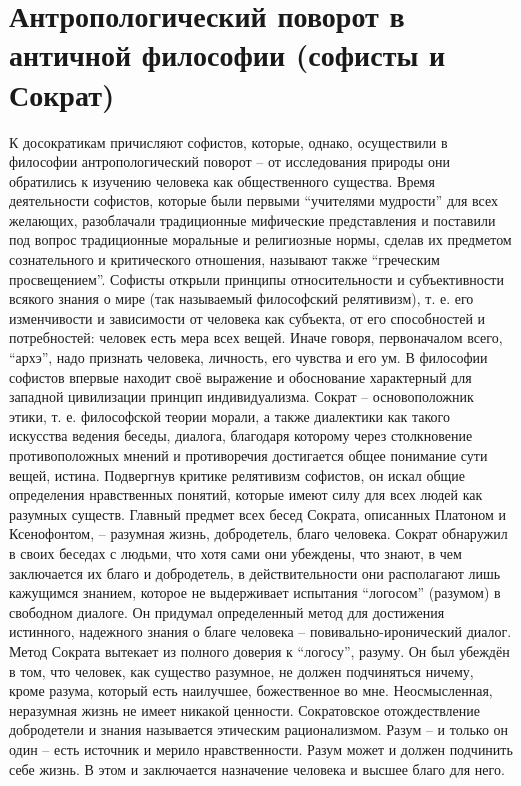 \documentclass[12pt]{article}
\begin{document}
\newpage
\section{Антропологический поворот в античной философии (софисты и Сократ)}
К досократикам причисляют софистов, которые, однако, осуществили в философии антропологический поворот
– от исследования природы они обратились к изучению человека как общественного существа. Время
деятельности софистов, которые были первыми “учителями мудрости” для всех желающих, разоблачали
традиционные мифические представления и поставили под вопрос традиционные моральные и религиозные
нормы, сделав их предметом сознательного и критического отношения, называют также “греческим
просвещением”. Софисты открыли принципы относительности и субъективности всякого знания о мире (так
называемый философский релятивизм), т. е. его изменчивости и зависимости от человека как субъекта, от его
способностей и потребностей: человек есть мера всех вещей. Иначе говоря, первоначалом всего, “архэ”, надо
признать человека, личность, его чувства и его ум. В философии софистов впервые находит своё выражение и
обоснование характерный для западной цивилизации принцип индивидуализма. 
Сократ – основоположник этики, т. е. философской теории морали, а также диалектики как такого искусства
ведения беседы, диалога, благодаря которому через столкновение противоположных мнений и противоречия
достигается общее понимание сути вещей, истина. Подвергнув критике релятивизм софистов, он искал общие
определения нравственных понятий, которые имеют силу для всех людей как разумных существ. Главный
предмет всех бесед Сократа, описанных Платоном и Ксенофонтом, – разумная жизнь, добродетель, благо
человека. 
Сократ обнаружил в своих беседах с людьми, что хотя сами они убеждены, что знают, в чем заключается их
благо и добродетель, в действительности они располагают лишь кажущимся знанием, которое не выдерживает
испытания “логосом” (разумом) в свободном диалоге. Он придумал определенный метод для достижения
истинного, надежного знания о благе человека – повивально-иронический диалог. Метод Сократа вытекает из
полного доверия к “логосу”, разуму. Он был убеждён в том, что человек, как существо разумное, не должен
подчиняться ничему, кроме разума, который есть наилучшее, божественное во мне. Неосмысленная, неразумная
жизнь не имеет никакой ценности. Сократовское отождествление добродетели и знания называется этическим
рационализмом. Разум – и только он один – есть источник и мерило нравственности. Разум может и должен
подчинить себе жизнь. В этом и заключается назначение человека и высшее благо для него. 
\end{document}
